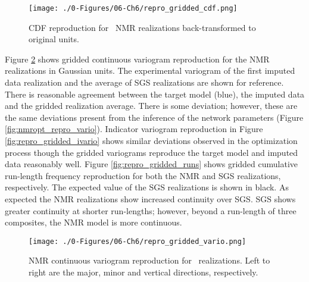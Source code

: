 \begin{figure}[htb!]
    \centering
    \texttt{[image: ./0-Figures/06-Ch6/repro\_gridded\_cdf.png]}
    \caption{ \gls{CDF} reproduction for \csnreals \ \gls{NMR} realizations back-transformed to original units. }
    \label{fig:repro_gridded_cdf}
\end{figure}


Figure \ref{fig:repro_gridded_vario} shows gridded continuous variogram reproduction for the \gls{NMR} realizations in Gaussian units. The experimental variogram of the first imputed data realization and the average of \gls{SGS} realizations are shown for reference. There is reasonable agreement between the target model (blue), the imputed data and the gridded realization average. There is some deviation; however, these are the same deviations present from the inference of the network parameters (Figure \ref{fig:nmropt_repro_vario}). Indicator variogram reproduction in Figure \ref{fig:repro_gridded_ivario} shows similar deviations observed in the optimization process though the gridded variograms reproduce the target model and imputed data reasonably well. Figure \ref{fig:repro_gridded_runs} shows gridded cumulative run-length frequency reproduction for both the \gls{NMR} and \gls{SGS} realizations, respectively. The expected value of the \gls{SGS} realizations is shown in black. As expected the \gls{NMR} realizations show increased continuity over \gls{SGS}. \gls{SGS} shows greater continuity at shorter run-lengths; however, beyond a run-length of three composites, the \gls{NMR} model is more continuous.


\begin{figure}[htb!]
    \centering
    \texttt{[image: ./0-Figures/06-Ch6/repro\_gridded\_vario.png]}
    \caption{\gls{NMR} continuous variogram reproduction for \csnreals \ realizations. Left to right are the major, minor and vertical directions, respectively.}
    \label{fig:repro_gridded_vario}
\end{figure}

